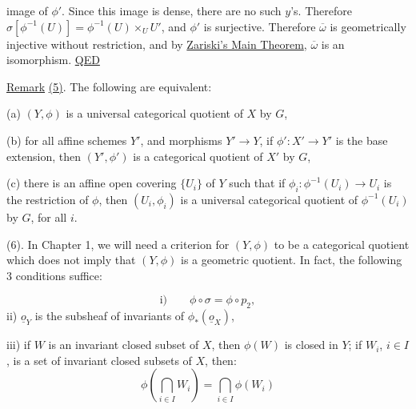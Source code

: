 image of $\phi'$. Since this image is dense, there are no such $y$'s.
Therefore $\sigma[\phi^{-1}(U)]=\phi^{-1}(U)\times_U U'$, and $\phi'$ is surjective.
Therefore $\overline\omega$ is geometrically injective without restriction, and by \uline{Zariski's Main Theorem}, $\overline\omega$ is an isomorphism. \uline{QED}
\margin{!}

\uline{Remark} \uline{(5)}. The following are equivalent:

(a) $(Y,\phi)$ is a universal categorical quotient of $X$ by $G$,

(b) for all affine schemes $Y'$, and morphisms $Y'\longrightarrow Y$, if $\phi':X'\to Y'$ is the base extension, then $(Y',\phi')$ is a categorical quotient of $X'$ by $G$,

(c) there is an affine open covering $\{U_i\}$ of $Y$ such that if $\phi_i:\phi^{-1}(U_i)\longrightarrow U_i$ is the restriction of $\phi$, then $(U_i,\phi_i)$ is a universal categorical quotient of $\phi^{-1}(U_i)$ by $G$, for all $i$.

(6). In Chapter 1, we will need a criterion for $(Y,\phi)$ to be a categorical quotient which does not imply that $(Y,\phi)$ is a geometric quotient. In fact, the following 3 conditions suffice:

\[
\text{i)}\qquad\phi\circ\sigma=\phi\circ p_2,
\]
ii) $\underline o_Y$ is the subsheaf of invariants of $\phi_*(\underline o_X)$,

iii) if $W$ is an invariant closed subset of $X$, then $\phi(W)$ is closed in $Y$; if $W_i$, $i\in I$, is a set of invariant closed subsets of $X$, then:
\[
\phi\left(\bigcap_{i\in I}W_i\right)=\bigcap_{i\in I}\phi(W_i)
\]
